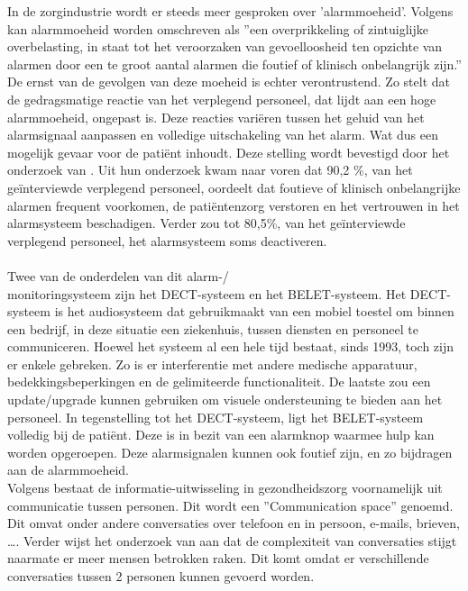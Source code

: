 In de zorgindustrie wordt er steeds meer gesproken over 'alarmmoeheid'. Volgens \textcite{Ferrara2023} kan alarmmoeheid worden omschreven als ''een overprikkeling of zintuiglijke overbelasting, in staat tot het veroorzaken van gevoelloosheid ten opzichte van alarmen door een te groot aantal alarmen die foutief of klinisch onbelangrijk zijn.'' De ernst van de gevolgen van deze moeheid is echter verontrustend. Zo stelt \textcite{Ferrara2023} dat de gedragsmatige reactie van het verplegend personeel, dat lijdt aan een hoge alarmmoeheid, ongepast is. Deze reacties variëren tussen het geluid van het alarmsignaal aanpassen en volledige uitschakeling van het alarm. Wat dus een mogelijk gevaar voor de patiënt inhoudt. Deze stelling wordt bevestigd door het onderzoek van \textcite{Casey2018}. Uit hun onderzoek kwam naar voren dat 90,2 \%, van het geïnterviewde verplegend personeel, oordeelt dat foutieve of klinisch onbelangrijke alarmen frequent voorkomen, de patiëntenzorg verstoren en het vertrouwen in het alarmsysteem beschadigen. Verder zou tot 80,5\%, van het geïnterviewde verplegend personeel, het alarmsysteem soms deactiveren.
\\\\
Twee van de onderdelen van dit alarm-/\\monitoringsysteem zijn het DECT-systeem en het BELET-systeem. Het DECT-systeem is het audiosysteem dat gebruikmaakt van een mobiel toestel om binnen een bedrijf, in deze situatie een ziekenhuis, tussen diensten en personeel te communiceren. Hoewel het systeem al een hele tijd bestaat, sinds 1993, toch zijn er enkele gebreken. Zo is er interferentie met andere medische apparatuur, bedekkingsbeperkingen en de gelimiteerde functionaliteit. De laatste zou een update/upgrade kunnen gebruiken om visuele ondersteuning te bieden aan het personeel.
In tegenstelling tot het DECT-systeem, ligt het BELET-systeem volledig bij de patiënt. Deze is in bezit van een alarmknop waarmee hulp kan worden opgeroepen. Deze alarmsignalen kunnen ook foutief zijn, en zo bijdragen aan de alarmmoeheid.\\

Volgens \textcite{Coiera2006} bestaat de informatie-uitwisseling in gezondheidszorg voornamelijk uit communicatie tussen personen. Dit wordt een ''Communication space'' genoemd. Dit omvat onder andere conversaties over telefoon en in persoon, e-mails, brieven, \ldots . Verder wijst het onderzoek van \textcite{Coiera2006} aan dat de complexiteit van conversaties stijgt naarmate er meer mensen betrokken raken. Dit komt omdat er verschillende conversaties tussen 2 personen kunnen gevoerd worden.

